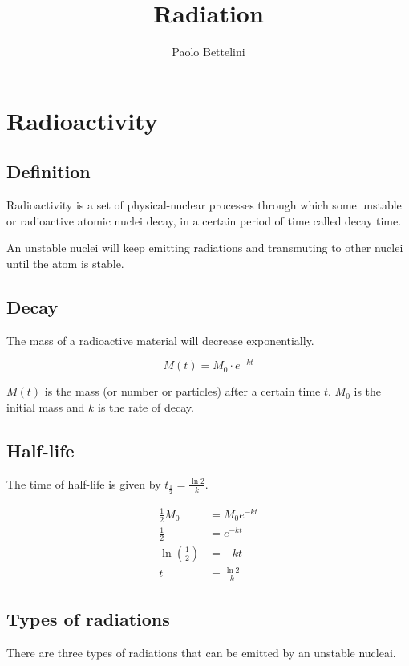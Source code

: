\documentclass{article}
\title{Radiation}
\author{Paolo Bettelini}
\date{}
\begin{document}
\maketitle
\tableofcontents
\pagebreak

\section{Radioactivity}

\subsection{Definition}

Radioactivity is a set of physical-nuclear processes
through which some unstable or radioactive atomic nuclei decay,
in a certain period of time called decay time.

An unstable nuclei will keep emitting radiations
and transmuting to other nuclei until the atom is stable.

\subsection{Decay}

The mass of a radioactive material will decrease exponentially.

\[
    M(t) = M_0 \cdot e^{-kt}
\]

\(M(t)\) is the mass (or number or particles)
after a certain time \(t\). \(M_0\) is the initial mass
and \(k\) is the rate of decay.

\subsection{Half-life}

The time of half-life is given by \(t_\frac{1}{2} = \frac{\ln 2}{k}\).

\begin{align*}
    \frac{1}{2}M_0 &= M_0 e^{-kt} \\
    \frac{1}{2} &= e^{-kt} \\
    \ln\left(\frac{1}{2}\right) &= -kt \\
    t &= \frac{\ln 2}{k}
\end{align*}

\subsection{Types of radiations}

There are three types of radiations that can be emitted by an unstable nucleai.
\end{document}
